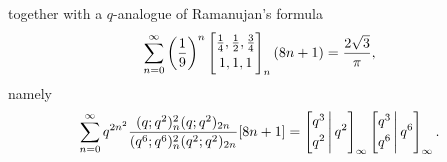 \documentclass[12pt]{article}
\begin{document}
 together with a $q$-analogue of Ramanujan's formula 
 \begin{equation}\label{Ramanujan1over9}
 \sum_{n = 
 0}^{\infty} \left( \frac{1}{9} \right)^{n} 
 \left[ \begin{matrix} \frac{1}{4}, \frac{1}{2}, \frac{3}{4} \vspace{1mm} \\ 
 1, 1, 1 \end{matrix} \right]_{n} (8 n + 1) = \frac{2\sqrt{3}}{\pi}, 
\end{equation}
 namely 
 $$ \sum_{n=0}^{\infty} q^{2n^2} 
 \frac{ (q;q^2)_{n}^{2} (q;q^2)_{2n} }{(q^6;q^6)_{n}^2 (q^2;q^2)_{2n} } 
 [8n+1] = \left[ \begin{matrix} q^3 \vspace{1mm} \\ 
 q^2 \end{matrix} \, \Bigg| \, q^2 \right]_{\infty} 
 \left[ \begin{matrix} q^3 \vspace{1mm} \\ 
 q^6 \end{matrix} \, \Bigg| \, q^6 \right]_{\infty}. $$
\end{document}

